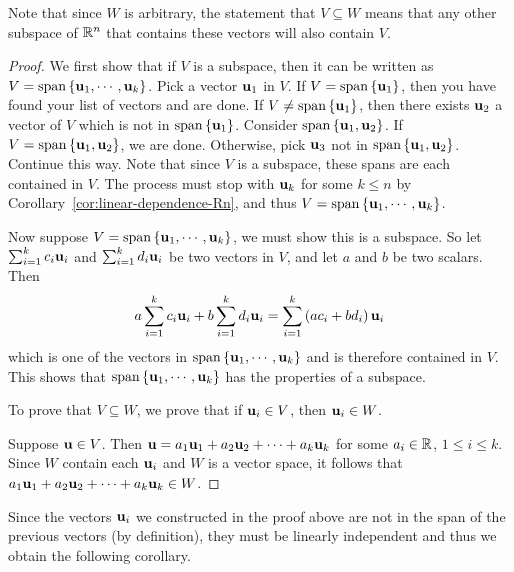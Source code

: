 Note that since $W$ is arbitrary, the statement that $V \subseteq W$ means that any other subspace of $\mathbb{R}^n$ that contains these vectors will also contain $V$. 

\begin{proof}
We first show that if $V$ is a subspace, then it can be written as $V= \sspan\set{\vect{u}_{1},\cdots ,\vect{u}_{k}}$. Pick a vector $\mbox{\bf u}_{1}$ in $V$. If $V=
\sspan\set{\vect{u}_{1}}$, then you have found your
list of vectors and are done. If $V\neq \sspan\set{\vect{u}_{1}}$, then
there exists $\mbox{\bf u}_{2}$ a vector of $V$ which is not in $
\sspan\set{\vect{u}_{1}}$. Consider $\sspan\set{
\vect{u}_{1},\vect{u}_{2}}$. 
If $V=\sspan\set{\vect{u}_{1},\vect{u}_{2}}$, we are
done. Otherwise, pick $\mbox{\bf u}_{3}$ not in $\sspan\set{\vect{u}_{1},\vect{u}_{2}}$. Continue this way.
Note that since $V $ is a subspace, these spans are each contained in
$V$.  The process must stop with $\mbox{\bf u}_{k}$ for some $k\leq n$
by Corollary~\ref{cor:linear-dependence-Rn}, and thus $V=\sspan\set{\vect{u}_{1},\cdots ,
\vect{u}_{k}}$.

Now suppose $V=\sspan\set{\vect{u}_{1},\cdots ,
\vect{u}_{k}}$, we must show this is a subspace. So let $\sum_{i=1}^{k}c_{i}\mbox{\bf u}_{i}$ and $
\sum_{i=1}^{k}d_{i}\mbox{\bf u}_{i}$ be two vectors in $V$, and let $a$
and $b$ be two scalars. Then 
\begin{equation*}
a \sum_{i=1}^{k}c_{i}\mbox{\bf u}_{i}+ b \sum_{i=1}^{k}d_{i}\mbox{\bf u}_{i}=
 \sum_{i=1}^{k}\left(a c_{i}+b  d_{i}\right) \mbox{\bf u}_{i}
\end{equation*}
which is one of the vectors in $\sspan\set{\vect{u}_{1},\cdots ,
\vect{u}_{k}}$ and is therefore contained in $V$. This shows that $\sspan\set{\vect{u}_{1},\cdots ,\vect{u}_{k}} $ has the properties of a subspace. 

To prove that $V \subseteq W$, we prove that if
$\mbox{\bf u}_i\in V$, then $\mbox{\bf u}_i \in W$.

Suppose $\mbox{\bf u}\in V$. 
Then $\mbox{\bf u}=a_1\mbox{\bf u}_1 + a_2\mbox{\bf u}_2 + \cdots + a_k\mbox{\bf u}_k$
for some $a_i\in\mathbb{R}$, $1\leq i\leq k$.
Since $W$ contain each $\mbox{\bf u}_i$ and $W$ is a vector space, it follows that $ a_1\mbox{\bf u}_1 + a_2\mbox{\bf u}_2 + \cdots + a_k\mbox{\bf u}_k \in W$. 
\end{proof}

Since the vectors $\mbox{\bf u}_i$ we constructed in the proof above are not in the span
of the previous vectors (by definition), they must be linearly independent and thus we
obtain the following corollary.

